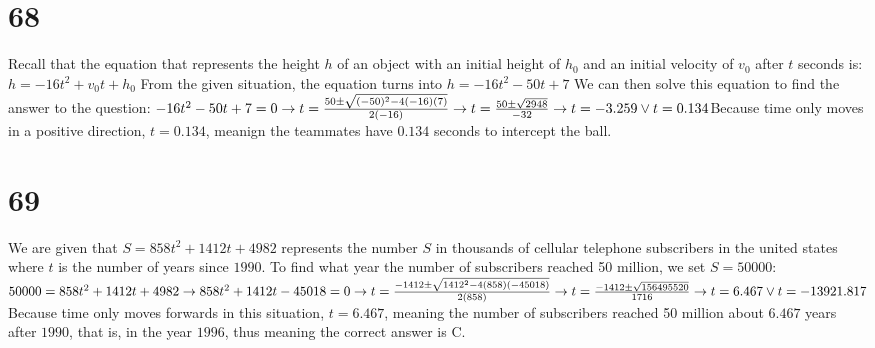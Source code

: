 \documentclass{article}
\theoremstyle{definition}
\begin{document}
\section*{68} 
Recall that the equation that represents the height $h$ of an object with an initial height of $h_0$ and an initial velocity of $v_0$ after $t$ seconds 
is:\newline $h=-16t^2+v_0t+h_0$\newline 
From the given situation, the equation turns into $h=-16t^2-50t+7$ We can then solve this equation to find the answer to the question:\newline 
$-16t^2-50t+7=0\newline\rightarrow 
t=\frac{50\pm\sqrt{(-50)^2-4(-16)(7)}}{2(-16)}\newline\rightarrow 
t=\frac{50\pm\sqrt{2948}}{-32}\newline\rightarrow 
t=-3.259\vee t=0.134$\newline Because time only moves in a positive direction, $t=0.134$, meanign the teammates have $0.134$ seconds to intercept the 
ball.

\section*{69}
We are given that $S=858t^2+1412t+4982$ represents the number $S$ in thousands of cellular telephone subscribers in the united states where 
$t$ is the number of years since $1990$. To find what year the number of subscribers reached 50 million, we set $S=50000$:\newline
$50000=858t^2+1412t+4982\newline\rightarrow 
858t^2+1412t-45018=0\newline\rightarrow 
t=\frac{-1412\pm\sqrt{1412^2-4(858)(-45018)}}{2(858)}\newline\rightarrow 
t=\frac{-1412\pm\sqrt{156495520}}{1716}\newline\rightarrow 
t=6.467\vee t=-13921.817$\newline 
Because time only moves forwards in this situation, $t=6.467$, meaning the number of subscribers reached 50 million about $6.467$ years after $1990$, 
that is, in the year $1996$, thus meaning the correct answer is C.
\end{document}
